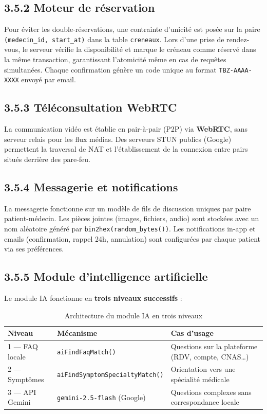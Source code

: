 \documentclass[12pt,a4paper]{report}
\begin{document}
\subsection*{3.5.2 Moteur de r\'eservation}

Pour \'eviter les double-r\'eservations, une contrainte d'unicit\'e est pos\'ee sur la paire \texttt{(medecin\_id, start\_at)} dans la table \texttt{creneaux}. Lors d'une prise de rendez-vous, le serveur v\'erifie la disponibilit\'e et marque le cr\'eneau comme r\'eserv\'e dans la m\^eme transaction, garantissant l'atomicit\'e m\^eme en cas de requ\^etes simultan\'ees. Chaque confirmation g\'en\`ere un code unique au format \texttt{TBZ-AAAA-XXXX} envoy\'e par email.

\subsection*{3.5.3 T\'el\'econsultation WebRTC}

La communication vid\'eo est \'etablie en pair-\`a-pair (P2P) via \textbf{WebRTC}, sans serveur relais pour les flux m\'edias. Des serveurs STUN publics (Google) permettent la traversal de NAT et l'\'etablissement de la connexion entre pairs situ\'es derri\`ere des pare-feu.

\subsection*{3.5.4 Messagerie et notifications}

La messagerie fonctionne sur un mod\`ele de fils de discussion uniques par paire patient-m\'edecin. Les pi\`eces jointes (images, fichiers, audio) sont stock\'ees avec un nom al\'eatoire g\'en\'er\'e par \texttt{bin2hex(random\_bytes())}. Les notifications in-app et emails (confirmation, rappel 24h, annulation) sont configur\'ees par chaque patient via ses pr\'ef\'erences.

\subsection*{3.5.5 Module d'intelligence artificielle}

Le module IA fonctionne en \textbf{trois niveaux successifs} :

\begin{table}[H]
\centering
\renewcommand{\arraystretch}{1.4}
\caption{Architecture du module IA en trois niveaux}
\begin{tabularx}{\textwidth}{|l|l|X|}
\hline
\textbf{Niveau} & \textbf{M\'ecanisme} & \textbf{Cas d'usage} \\
\hline
1 --- FAQ locale   & \texttt{aiFindFaqMatch()}              & Questions sur la plateforme (RDV, compte, CNAS\ldots) \\
\hline
2 --- Sympt\^omes  & \texttt{aiFindSymptomSpecialtyMatch()} & Orientation vers une sp\'ecialit\'e m\'edicale \\
\hline
3 --- API Gemini   & \texttt{gemini-2.5-flash} (Google)    & Questions complexes sans correspondance locale \\
\hline
\end{tabularx}
\end{table}
\end{document}
